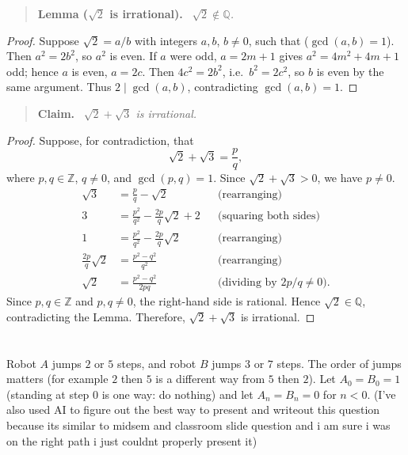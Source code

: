 \documentclass[11pt,a4paper]{article}
\newcommand{\Q}{\mathbb{Q}}
\newenvironment{claimbox}[1][]{\par\smallskip\begin{quote}\textbf{#1.}\ \itshape}{\end{quote}}
\theoremstyle{definition}
\begin{document}
\begin{claimbox}[Lemma ($\sqrt2$ is irrational)]
$\sqrt2\notin\Q$.
\end{claimbox}
\begin{proof}
Suppose $\sqrt2=a/b$ with integers $a,b$, $b\neq0$, such that ($\gcd(a,b)=1$). Then $a^2=2b^2$, so $a^2$ is even. If $a$ were odd, $a=2m+1$ gives $a^2=4m^2+4m+1$ odd; hence $a$ is even, $a=2c$. Then $4c^2=2b^2$, i.e.\ $b^2=2c^2$, so $b$ is even by the same argument. Thus $2\mid\gcd(a,b)$, contradicting $\gcd(a,b)=1$.
\end{proof}

\begin{claimbox}[Claim]
$\sqrt2+\sqrt3$ is irrational.
\end{claimbox}
\begin{proof}
Suppose, for contradiction, that \[ \sqrt2+\sqrt3=\frac pq, \] where $p,q\in\mathbb Z$, $q\neq0$, and $\gcd(p,q)=1$. Since $\sqrt2+\sqrt3>0$, we have $p\neq0$.\begin{align*}
\sqrt3&=\frac pq-\sqrt2 &&\text{(rearranging)}\\ 3&=\frac{p^2}{q^2}-\frac{2p}{q}\sqrt2+2 &&\text{(squaring both sides)}\\ 1&=\frac{p^2}{q^2}-\frac{2p}{q}\sqrt2 &&\text{(rearranging)}\\ \frac{2p}{q}\sqrt2&=\frac{p^2-q^2}{q^2} &&\text{(rearranging)}\\ \sqrt2&=\frac{p^2-q^2}{2pq} &&\text{(dividing by }2p/q\neq0\text{)}.
\end{align*}
Since $p,q\in\mathbb Z$ and $p,q\neq0$, the right-hand side is rational. Hence $\sqrt2\in\mathbb Q$, contradicting the Lemma. Therefore, $\sqrt2+\sqrt3$ is irrational.\end{proof}










\section{}

Robot $A$ jumps $2$ or $5$ steps, and robot $B$ jumps $3$ or $7$ steps. The order of jumps matters
(for example $2$ then $5$ is a different way from $5$ then $2$).
Let $A_0=B_0=1$ (standing at step $0$ is one way: do nothing) and let $A_n=B_n=0$ for $n<0$. (I've also used AI to figure out the best way to present and writeout this question because its similar to midsem and classroom slide question and i am sure i was on the right path i just couldnt properly present it)
\end{document}

